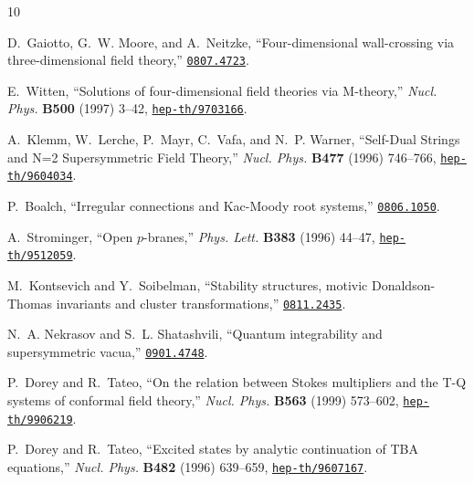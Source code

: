 \begin{thebibliography}{10}

D.~Gaiotto, G.~W. Moore, and A.~Neitzke, ``{Four-dimensional wall-crossing via
  three-dimensional field theory},''
\href{http://www.arXiv.org/abs/0807.4723}{{\tt 0807.4723}}.

E.~Witten, ``Solutions of four-dimensional field theories via {M}-theory,''
  {\em Nucl. Phys.} {\bf B500} (1997) 3--42,
\href{http://www.arXiv.org/abs/hep-th/9703166}{{\tt hep-th/9703166}}.

A.~Klemm, W.~Lerche, P.~Mayr, C.~Vafa, and N.~P. Warner, ``{Self-Dual Strings
  and N=2 Supersymmetric Field Theory},'' {\em Nucl. Phys.} {\bf B477} (1996)
  746--766,
\href{http://www.arXiv.org/abs/hep-th/9604034}{{\tt hep-th/9604034}}.

P.~Boalch, ``{I}rregular connections and {K}ac-{M}oody root systems,''
  \href{http://www.arXiv.org/abs/0806.1050}{{\tt 0806.1050}}.

A.~Strominger, ``Open {$p$}-branes,'' {\em Phys. Lett.} {\bf B383} (1996)
  44--47,
\href{http://arXiv.org/abs/hep-th/9512059}{{\tt hep-th/9512059}}.

M.~Kontsevich and Y.~Soibelman, ``{S}tability structures, motivic
  {D}onaldson-{T}homas invariants and cluster transformations,''
  \href{http://www.arXiv.org/abs/0811.2435}{{\tt 0811.2435}}.

N.~A. Nekrasov and S.~L. Shatashvili, ``{Quantum integrability and
  supersymmetric vacua},''
\href{http://www.arXiv.org/abs/0901.4748}{{\tt 0901.4748}}.

P.~Dorey and R.~Tateo, ``{On the relation between Stokes multipliers and the
  T-Q systems of conformal field theory},'' {\em Nucl. Phys.} {\bf B563} (1999)
  573--602,
\href{http://www.arXiv.org/abs/hep-th/9906219}{{\tt hep-th/9906219}}.

P.~Dorey and R.~Tateo, ``{Excited states by analytic continuation of TBA
  equations},'' {\em Nucl. Phys.} {\bf B482} (1996) 639--659,
\href{http://www.arXiv.org/abs/hep-th/9607167}{{\tt hep-th/9607167}}.


\end{thebibliography}
